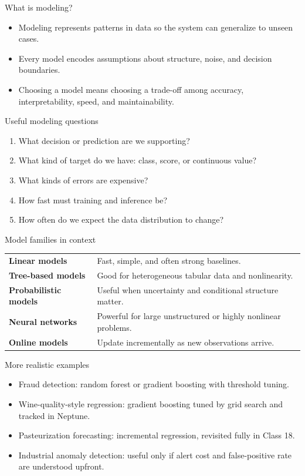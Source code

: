 \begin{frame}{What is modeling?}
\begin{itemize}
\item Modeling represents patterns in data so the system can generalize to unseen cases.
\item Every model encodes assumptions about structure, noise, and decision boundaries.
\item Choosing a model means choosing a trade-off among accuracy, interpretability, speed, and maintainability.
\end{itemize}
\coursefooter
\end{frame}

\begin{frame}{Useful modeling questions}
\begin{enumerate}
\item What decision or prediction are we supporting?
\item What kind of target do we have: class, score, or continuous value?
\item What kinds of errors are expensive?
\item How fast must training and inference be?
\item How often do we expect the data distribution to change?
\end{enumerate}
\coursefooter
\end{frame}

\begin{frame}{Model families in context}
\begin{tabularx}{\textwidth}{>{\bfseries}l X}
Linear models & Fast, simple, and often strong baselines. \\
Tree-based models & Good for heterogeneous tabular data and nonlinearity. \\
Probabilistic models & Useful when uncertainty and conditional structure matter. \\
Neural networks & Powerful for large unstructured or highly nonlinear problems. \\
Online models & Update incrementally as new observations arrive. \\
\end{tabularx}
\coursefooter
\end{frame}

\begin{frame}{More realistic examples}
\begin{itemize}
\item Fraud detection: random forest or gradient boosting with threshold tuning.
\item Wine-quality-style regression: gradient boosting tuned by grid search and tracked in Neptune.
\item Pasteurization forecasting: incremental regression, revisited fully in Class 18.
\item Industrial anomaly detection: useful only if alert cost and false-positive rate are understood upfront.
\end{itemize}
\coursefooter
\end{frame}

